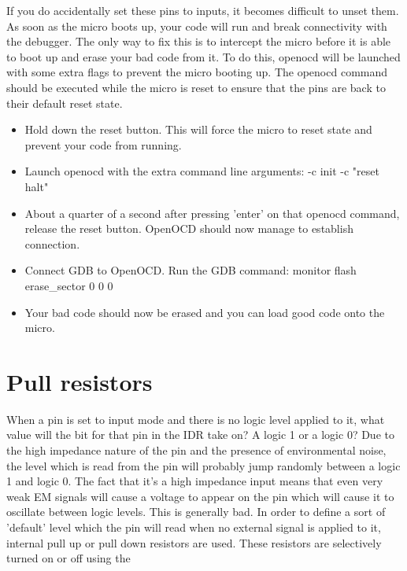 If you do accidentally set these pins to inputs, it becomes difficult to unset them. As soon as the micro boots up, your code will run and break connectivity with the debugger. The only way to fix this is to intercept the micro before it is able to boot up and erase your bad code from it.
To do this, openocd will be launched with some extra flags to prevent the micro booting up. The openocd command should be executed while the micro is reset to ensure that the pins are back to their default reset state.
\begin{itemize}
  \item Hold down the reset button. This will force the micro to reset state and prevent your code from running.
  \item Launch openocd with the extra command line arguments: -c init -c "reset halt"
  \item About a quarter of a second after pressing 'enter' on that openocd command, release the reset button. OpenOCD should now manage to establish connection.
  \item Connect GDB to OpenOCD. Run the GDB command: monitor flash erase\_sector 0 0 0
  \item Your bad code should now be erased and you can load good code onto the micro.
\end{itemize}

\section{Pull resistors}
When a pin is set to input mode and there is no logic level applied to it, what value will the bit for that pin in the IDR take on? A logic 1 or a logic 0? Due to the high impedance nature of the pin and the presence of environmental noise, the level which is read from the pin will probably jump randomly between a logic 1 and logic 0. The fact that it's a high impedance input means that even very weak EM signals will cause a voltage to appear on the pin which will cause it to oscillate between logic levels. This is generally bad. In order to define a sort of 'default' level which the pin will read when no external signal is applied to it, internal pull up or pull down resistors are used. These resistors are selectively turned on or off using the 

